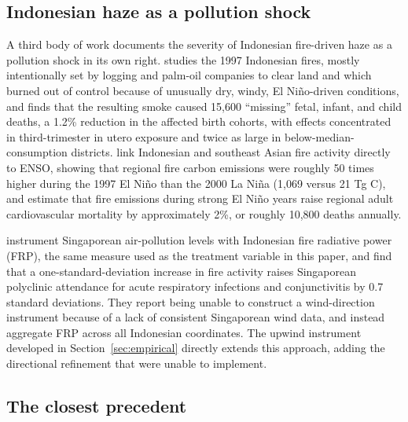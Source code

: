 \documentclass[12pt]{article}
\begin{document}
\subsection{Indonesian haze as a pollution shock}

A third body of work documents the severity of Indonesian fire-driven haze as a pollution shock in its own right. \citet{jayachandran2009} studies the 1997 Indonesian fires, mostly intentionally set by logging and palm-oil companies to clear land and which burned out of control because of unusually dry, windy, El Ni\~{n}o-driven conditions, and finds that the resulting smoke caused 15,600 ``missing'' fetal, infant, and child deaths, a 1.2\% reduction in the affected birth cohorts, with effects concentrated in third-trimester in utero exposure and twice as large in below-median-consumption districts. \citet{marlier2013} link Indonesian and southeast Asian fire activity directly to ENSO, showing that regional fire carbon emissions were roughly 50 times higher during the 1997 El Ni\~{n}o than the 2000 La Ni\~{n}a (1,069 versus 21 Tg C), and estimate that fire emissions during strong El Ni\~{n}o years raise regional adult cardiovascular mortality by approximately 2\%, or roughly 10,800 deaths annually.

\citet{sheldonsankaran2017} instrument Singaporean air-pollution levels with Indonesian fire radiative power (FRP), the same measure used as the treatment variable in this paper, and find that a one-standard-deviation increase in fire activity raises Singaporean polyclinic attendance for acute respiratory infections and conjunctivitis by 0.7 standard deviations. They report being unable to construct a wind-direction instrument because of a lack of consistent Singaporean wind data, and instead aggregate FRP across all Indonesian coordinates. The upwind instrument developed in Section~\ref{sec:empirical} directly extends this approach, adding the directional refinement that \citet{sheldonsankaran2017} were unable to implement.

\subsection{The closest precedent}
\end{document}
